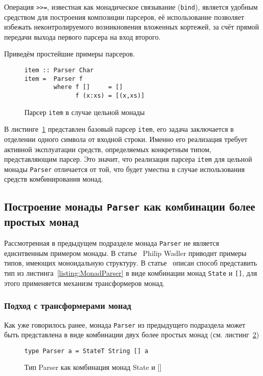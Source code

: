 Операция \lstinline{>>=}, известная как монадическое связывание (\lstinline{bind}), является удобным средством для построения композиции парсеров, её использование позволяет избежать неконтролируемого возникновения вложенных кортежей, за счёт прямой передачи выхода первого парсера на вход второго. 

Приведём простейшие примеры парсеров. 

\begin{figure}[h]
  \begin{lstlisting}
item :: Parser Char
item =  Parser f 
        where f []     = []
              f (x:xs) = [(x,xs)]
  \end{lstlisting}
  \caption{Парсер \lstinline{item} в случае цельной монады}
  \label{listing:ParserItem}
\end{figure}

В листинге~\ref{listing:ParserItem} представлен базовый парсер \lstinline{item}, его задача заключается в отделении одного символа от входной строки. Именно его реализация требует активной эксплуатации средств, определяемых конкретным типом, представляющим парсер. Это значит, что реализация парсера \lstinline{item} для цельной монады \lstinline{Parser} отличается от той, что будет уместна в случае использования средств комбинирования монад.

\subsection{Построение монады \lstinline{Parser} как комбинации более простых монад}

Рассмотренная в предыдущем подразделе монада \lstinline{Parser} не является едиснтвенным примером монады. В статье~\autocite{WadlerMonads} Philip Wadler приводит примеры типов, имеющих моноидальную структуру. В статье~\autocite{MonParsing} описан способ представить тип из листинга~\ref{listing:MonadParser} в виде комбинации монад \lstinline{State} и \lstinline{[]}, для этого применяется механизм трансформеров монад. 

\subsubsection{Подход с трансформерами монад}

Как уже говорилось ранее, монада \lstinline{Parser} из предыдущего подраздела может быть представлена в виде комбинации двух более простых монад (см. листинг~\ref{listing:MonadTransParser})

\begin{figure}[h]
\begin{lstlisting}
type Parser a = StateT String [] a
\end{lstlisting}
\caption{Тип Parser как комбинация монад State и []}
\label{listing:MonadTransParser}
\end{figure}

